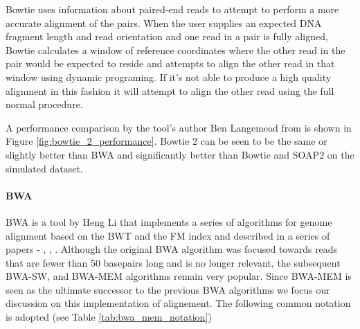 Bowtie uses information about paired-end reads to attempt to perform a more accurate alignment of the pairs. When the user supplies an expected DNA fragment length and read orientation and one read in a pair is fully aligned, Bowtie calculates a window of reference coordinates where the other read in the pair would be expected to reside and attempts to align the other read in that window using dynamic programing. If it's not able to produce a high quality alignment in this fashion it will attempt to align the other read using the full normal procedure. 

A performance comparison by the tool's author Ben Langemead from \autocite{langmead2012fast} is shown in Figure \ref{fig:bowtie_2_performance}. Bowtie 2 can be seen to be the same or slightly better than BWA and significantly better than Bowtie and SOAP2 on the simulated dataset.

\paragraph{BWA}

BWA is a tool by Heng Li that implements a series of algorithms for genome alignment based on the BWT and the FM index and described in a series of papers - \autocite{li2009fast}, \autocite{li2010fast}, \autocite{li2013aligning}. Although the original BWA algorithm was focused towards reads that are fewer than 50 basepairs long and is no longer relevant, the subsequent BWA-SW, and BWA-MEM algorithms remain very popular. Since BWA-MEM is seen as the ultimate successor to the previous BWA algorithms we focus our discussion on this implementation of alignement. The following common notation is adopted (see Table \ref{tab:bwa_mem_notation})

